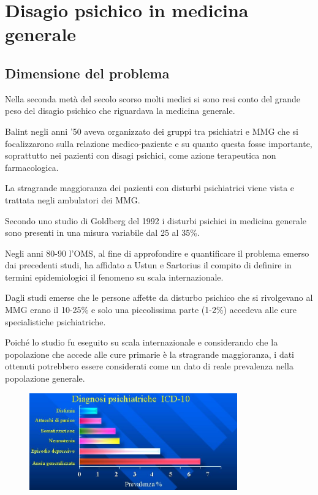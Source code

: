 \section{Disagio psichico in medicina generale}

\subsection{Dimensione del problema}

Nella seconda metà del secolo scorso molti medici si sono resi conto del
grande peso del disagio psichico che riguardava la medicina generale.

Balint negli anni '50 aveva organizzato dei gruppi tra psichiatri e MMG
che si focalizzarono sulla relazione medico-paziente e su quanto questa
fosse importante, soprattutto nei pazienti con disagi psichici, come
azione terapeutica non farmacologica.

La stragrande maggioranza dei pazienti con disturbi psichiatrici viene
vista e trattata negli ambulatori dei MMG.

Secondo uno studio di Goldberg del 1992 i disturbi psichici in medicina
generale sono presenti in una misura variabile dal 25 al 35\%.

Negli anni 80-90 l'OMS, al fine di approfondire e quantificare il
problema emerso dai precedenti studi, ha affidato a Ustun e Sartorius il
compito di definire in termini epidemiologici il fenomeno su scala
internazionale.

Dagli studi emerse che le persone affette da disturbo psichico che si
rivolgevano al MMG erano il 10-25\% e solo una piccolissima parte
(1-2\%) accedeva alle cure specialistiche psichiatriche.

Poiché lo studio fu eseguito su scala internazionale e considerando che
la popolazione che accede alle cure primarie è la stragrande
maggioranza, i dati ottenuti potrebbero essere considerati come un dato
di reale prevalenza nella popolazione generale.

\begin{figure}[!ht]
\centering
	\includegraphics[width=0.8\textwidth]{42/image1.jpeg}
	\end{figure}
	
